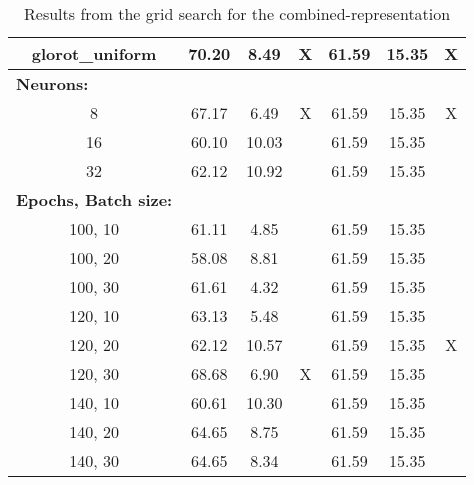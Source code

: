 \begin{table}[H]
\begin{tabular}{ccccccc}
glorot\_uniform & 70.20 	& 8.49   & X      & 61.59     & 15.35    & X     \\ \hline
\multicolumn{1}{l}{\textbf{Neurons:}} &  &  &  &  &  &  \\
8        		& 67.17    	& 6.49    & X      & 61.59     & 15.35    & X     \\
16              & 60.10     & 10.03   &        & 61.59     & 15.35    &       \\
32              & 62.12     & 10.92   &        & 61.59     & 15.35    &       \\ \hline
\multicolumn{1}{l}{\textbf{Epochs, Batch size:}}  &  &  &  &  &  &   \\
100, 10         & 61.11     & 4.85   &        & 61.59     & 15.35    &       \\
100, 20         & 58.08     & 8.81   &        & 61.59     & 15.35    &       \\
100, 30         & 61.61     & 4.32   &        & 61.59     & 15.35    &       \\
120, 10         & 63.13     & 5.48   &        & 61.59     & 15.35    &       \\
120, 20         & 62.12     & 10.57  &        & 61.59     & 15.35    & X     \\
120, 30         & 68.68     & 6.90   & X      & 61.59     & 15.35    &       \\
140, 10         & 60.61     & 10.30  &        & 61.59     & 15.35    &       \\
140, 20         & 64.65     & 8.75   &        & 61.59     & 15.35    &       \\
140, 30         & 64.65     & 8.34   &        & 61.59     & 15.35    &       \\ \hline
\end{tabular}
\caption{Results from the grid search for the combined-representation}
\label{tab:GridCombined}
\end{table}